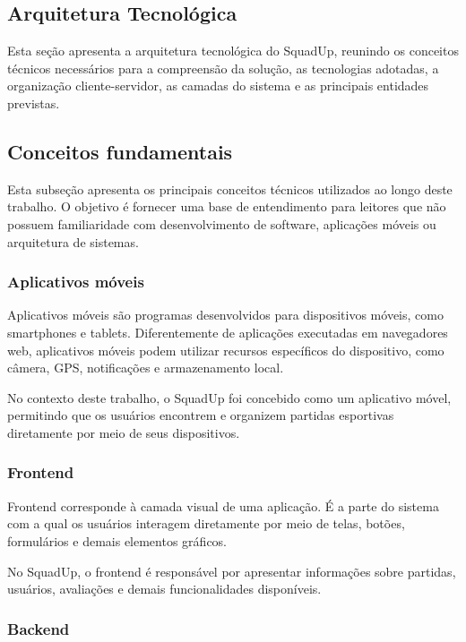 \documentclass[a4paper, 12pt]{article}
\begin{document}
\begin{justify}
\clearpage

\section{Arquitetura Tecnológica}

Esta seção apresenta a arquitetura tecnológica do SquadUp, reunindo os conceitos técnicos necessários para a compreensão da solução, as tecnologias adotadas, a organização cliente-servidor, as camadas do sistema e as principais entidades previstas.

\subsection{Conceitos fundamentais}

Esta subseção apresenta os principais conceitos técnicos utilizados ao longo deste trabalho. O objetivo é fornecer uma base de entendimento para leitores que não possuem familiaridade com desenvolvimento de software, aplicações móveis ou arquitetura de sistemas.

\subsubsection{Aplicativos móveis}

Aplicativos móveis são programas desenvolvidos para dispositivos móveis, como smartphones e tablets. Diferentemente de aplicações executadas em navegadores web, aplicativos móveis podem utilizar recursos específicos do dispositivo, como câmera, GPS, notificações e armazenamento local.

No contexto deste trabalho, o SquadUp foi concebido como um aplicativo móvel, permitindo que os usuários encontrem e organizem partidas esportivas diretamente por meio de seus dispositivos.

\subsubsection{Frontend}

Frontend corresponde à camada visual de uma aplicação. É a parte do sistema com a qual os usuários interagem diretamente por meio de telas, botões, formulários e demais elementos gráficos.

No SquadUp, o frontend é responsável por apresentar informações sobre partidas, usuários, avaliações e demais funcionalidades disponíveis.

\subsubsection{Backend}


\end{justify}
\end{document}

